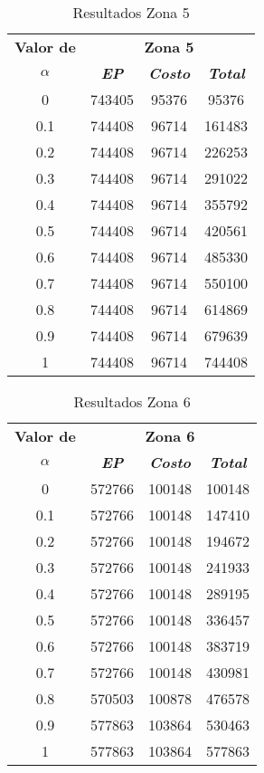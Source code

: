 \documentclass[conference]{IEEEtran}
\begin{document}
\begin{table}[H]
\caption{Resultados Zona 5}
\begin{center}
\begin{tabular}{|c|c|c|c|}
\hline
\textbf{Valor de}&\multicolumn{3}{|c|}{\textbf{Zona 5}} \\
\cline{2-4} 
\textbf{$\alpha$} & \textbf{\textit{EP}}& \textbf{\textit{Costo}}& \textbf{\textit{Total}} \\
\hline
0&743405&95376&95376\\ \hline
0.1&744408&96714&161483\\ \hline
0.2&744408&96714&226253\\ \hline
0.3&744408&96714&291022\\ \hline
0.4&744408&96714&355792\\ \hline
0.5&744408&96714&420561\\ \hline
0.6&744408&96714&485330\\ \hline
0.7&744408&96714&550100\\ \hline
0.8&744408&96714&614869\\ \hline
0.9&744408&96714&679639\\ \hline
1&744408&96714&744408\\ \hline
\end{tabular}
\label{tab1}
\end{center}
\end{table}

\begin{table}[H]
\caption{Resultados Zona 6}
\begin{center}
\begin{tabular}{|c|c|c|c|}
\hline
\textbf{Valor de}&\multicolumn{3}{|c|}{\textbf{Zona 6}} \\
\cline{2-4} 
\textbf{$\alpha$} & \textbf{\textit{EP}}& \textbf{\textit{Costo}}& \textbf{\textit{Total}} \\
\hline
0&572766&100148&100148\\ \hline
0.1&572766&100148&147410\\ \hline
0.2&572766&100148&194672\\ \hline
0.3&572766&100148&241933\\ \hline
0.4&572766&100148&289195\\ \hline
0.5&572766&100148&336457\\ \hline
0.6&572766&100148&383719\\ \hline
0.7&572766&100148&430981\\ \hline
0.8&570503&100878&476578\\ \hline
0.9&577863&103864&530463\\ \hline
1&577863&103864&577863\\ \hline
\end{tabular}
\label{tab1}
\end{center}
\end{table}
\end{document}
